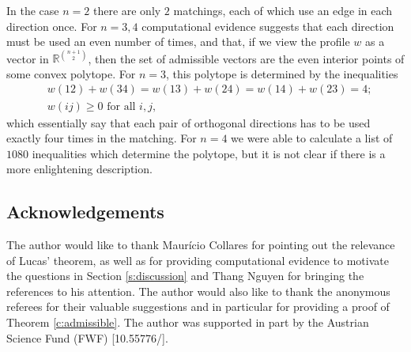 \documentclass{article}
\begin{document}
In the case $n=2$ there are only $2$ matchings, each of which use an edge in each direction once. For $n=3,4$ computational evidence suggests that each direction must be used an even number of times, and that, if we view the profile $w$ as a vector in $\mathbb{R}^{\binom{n+1}{2}}$, then the set of admissible vectors are the even interior points of some convex polytope. For $n=3$, this polytope is determined by the inequalities
\begin{align*}
&w(12) + w(34) = w(13) + w(24) = w(14)+w(23)=4;\\
&w(ij) \geq 0 \text{ for all } i,j,
\end{align*}
which essentially say that each pair of orthogonal directions has to be used exactly four times in the matching. For $n=4$ we were able to calculate a list of $1080$ inequalities which determine the polytope, but it is not clear if there is a more enlightening description.


\subsection*{Acknowledgements}
The author would like to thank Maur\'{i}cio Collares for pointing out the relevance of Lucas' theorem, as well as for providing computational evidence to motivate the questions in Section \ref{s:discussion} and Thang Nguyen for bringing the references \cite{P21,P12} to his attention. The author would also like to thank the anonymous referees for their valuable suggestions and in particular for providing a proof of Theorem \ref{c:admissible}. The author was supported in part by the Austrian Science Fund (FWF) [10.55776/].



 
\end{document}

